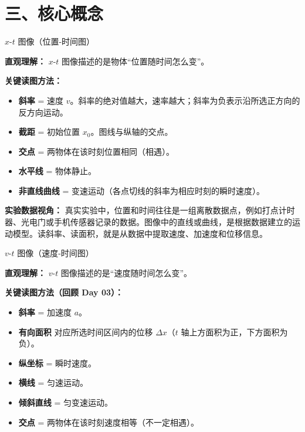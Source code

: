 \section*{三、核心概念}

\begin{conceptbox}{$x$-$t$ 图像（位置-时间图）}

\textbf{直观理解：} $x$-$t$ 图像描述的是物体“位置随时间怎么变”。

\begin{center}


\label{fig:xt-graph}
\end{center}

\textbf{关键读图方法：}
\begin{itemize}
  \item \textbf{斜率} = 速度 $v$。斜率的绝对值越大，速率越大；斜率为负表示沿所选正方向的反方向运动。
  \item \textbf{截距} = 初始位置 $x_0$。图线与纵轴的交点。
  \item \textbf{交点} = 两物体在该时刻位置相同（相遇）。
  \item \textbf{水平线} = 物体静止。
  \item \textbf{非直线曲线} = 变速运动（各点切线的斜率为相应时刻的瞬时速度）。
\end{itemize}

\textbf{实验数据视角：} 真实实验中，位置和时间往往是一组离散数据点，例如打点计时器、光电门或手机传感器记录的数据。图像中的直线或曲线，是根据数据建立的运动模型。读斜率、读面积，就是从数据中提取速度、加速度和位移信息。

\end{conceptbox}

\begin{conceptbox}{$v$-$t$ 图像（速度-时间图）}

\textbf{直观理解：} $v$-$t$ 图像描述的是“速度随时间怎么变”。

\textbf{关键读图方法（回顾 Day 03）：}
\begin{itemize}
  \item \textbf{斜率} = 加速度 $a$。
  \item \textbf{有向面积} 对应所选时间区间内的位移 $\Delta x$（$t$ 轴上方面积为正，下方面积为负）。
  \item \textbf{纵坐标} = 瞬时速度。
  \item \textbf{横线} = 匀速运动。
  \item \textbf{倾斜直线} = 匀变速运动。
  \item \textbf{交点} = 两物体在该时刻速度相等（不一定相遇）。
\end{itemize}

\begin{center}


\label{fig:vt-comparison}
\end{center}

\end{conceptbox}

